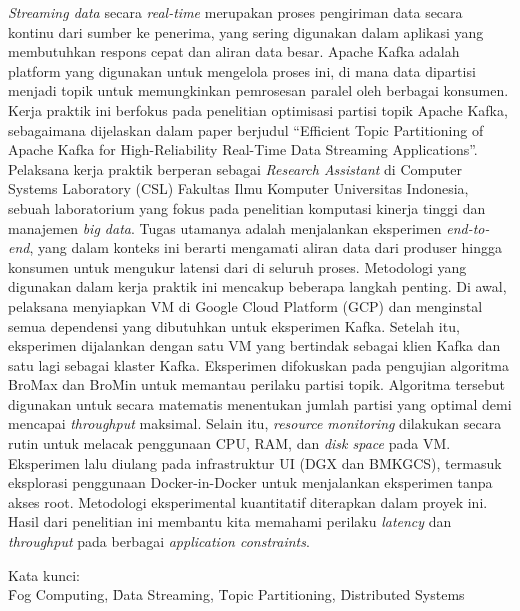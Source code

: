 \noindent \textit{Streaming data} secara \textit{real-time} merupakan proses pengiriman data secara kontinu dari sumber ke penerima, yang sering digunakan dalam aplikasi yang membutuhkan respons cepat dan aliran data besar. Apache Kafka adalah platform yang digunakan untuk mengelola proses ini, di mana data dipartisi menjadi topik untuk memungkinkan pemrosesan paralel oleh berbagai konsumen. Kerja praktik ini berfokus pada penelitian optimisasi partisi topik Apache Kafka, sebagaimana dijelaskan dalam paper berjudul ``Efficient Topic Partitioning of Apache Kafka for High-Reliability Real-Time Data Streaming Applications''. Pelaksana kerja praktik berperan sebagai \textit{Research Assistant} di Computer Systems Laboratory (CSL) Fakultas Ilmu Komputer Universitas Indonesia, sebuah laboratorium yang fokus pada penelitian komputasi kinerja tinggi dan manajemen \textit{big data}. Tugas utamanya adalah menjalankan eksperimen \textit{end-to-end}, yang dalam konteks ini berarti mengamati aliran data dari produser hingga konsumen untuk mengukur latensi dari di seluruh proses. Metodologi yang digunakan dalam kerja praktik ini mencakup beberapa langkah penting. Di awal, pelaksana menyiapkan VM di Google Cloud Platform (GCP) dan menginstal semua dependensi yang dibutuhkan untuk eksperimen Kafka. Setelah itu, eksperimen dijalankan dengan satu VM yang bertindak sebagai klien Kafka dan satu lagi sebagai klaster Kafka. Eksperimen difokuskan pada pengujian algoritma BroMax dan BroMin untuk memantau perilaku partisi topik. Algoritma tersebut digunakan untuk secara matematis menentukan jumlah partisi yang optimal demi mencapai \textit{throughput} maksimal. Selain itu, \textit{resource monitoring} dilakukan secara rutin untuk melacak penggunaan CPU, RAM, dan \textit{disk space} pada VM. Eksperimen lalu diulang pada infrastruktur UI (DGX dan BMKGCS), termasuk eksplorasi penggunaan Docker-in-Docker untuk menjalankan eksperimen tanpa akses root. Metodologi eksperimental kuantitatif diterapkan dalam proyek ini. Hasil dari penelitian ini membantu kita memahami perilaku \textit{latency} dan \textit{throughput} pada berbagai \textit{application constraints}. \\

\vspace*{0.2cm}

\noindent Kata kunci: \\ \f{Fog Computing}, \f{Data Streaming}, \f{Topic Partitioning}, \f{Distributed Systems} \\

\newpage
